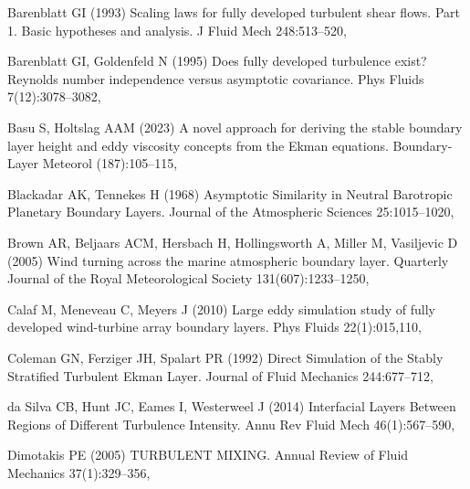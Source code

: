 \documentclass[smallcondensed,final]{svjour3}
\begin{document}
\begin{thebibliography}{57}
Barenblatt GI (1993) Scaling laws for fully developed turbulent shear flows.
  {{Part}} 1. {{Basic}} hypotheses and analysis. J Fluid Mech 248:513--520,

Barenblatt GI, Goldenfeld N (1995) Does fully developed turbulence exist?
  {{Reynolds}} number independence versus asymptotic covariance. Phys Fluids
  7(12):3078--3082, 

Basu S, Holtslag AAM (2023) A novel approach for deriving the stable boundary layer height and eddy viscosity concepts from the Ekman equations. Boundary-Layer Meteorol (187):105--115, \doi{}

Blackadar AK, Tennekes H (1968) Asymptotic {{Similarity}} in {{Neutral
  Barotropic Planetary Boundary Layers}}. Journal of the Atmospheric Sciences
  25:1015--1020, 

Brown AR, Beljaars ACM, Hersbach H, Hollingsworth A, Miller M, Vasiljevic D
  (2005) Wind turning across the marine atmospheric boundary layer. Quarterly
  Journal of the Royal Meteorological Society 131(607):1233--1250,

Calaf M, Meneveau C, Meyers J (2010) Large eddy simulation study of fully
  developed wind-turbine array boundary layers. Phys Fluids 22(1):015,110,

Coleman GN, Ferziger JH, Spalart PR (1992) Direct {{Simulation}} of the
  {{Stably Stratified Turbulent Ekman Layer}}. Journal of Fluid Mechanics
  244:677--712, 

{da Silva} CB, Hunt JC, Eames I, Westerweel J (2014) Interfacial {{Layers
  Between Regions}} of {{Different Turbulence Intensity}}. Annu Rev Fluid Mech
  46(1):567--590, 

Dimotakis PE (2005) {{TURBULENT MIXING}}. Annual Review of Fluid Mechanics
  37(1):329--356, 


\end{thebibliography}
\end{document}
